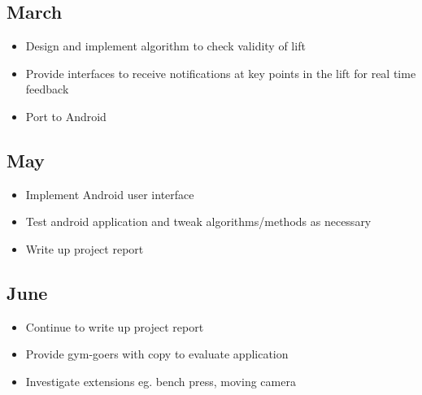\subsection{March}

\begin{itemize}
	\item Design and implement algorithm to check validity of lift
	\item Provide interfaces to receive notifications at key points in the lift for real time feedback
	\item Port to Android
\end{itemize}

\subsection{May}

\begin{itemize}
	\item Implement Android user interface
	\item Test android application and tweak algorithms/methods as necessary
	\item Write up project report
\end{itemize}

\subsection{June}

\begin{itemize}
	\item Continue to write up project report
	\item Provide gym-goers with copy to evaluate application
	\item Investigate extensions eg. bench press, moving camera
\end{itemize}